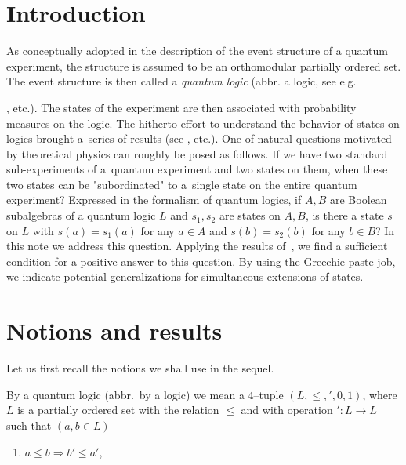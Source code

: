 \documentclass{article}
\begin{document}


\section{Introduction}

As conceptually adopted in the description of the event structure of a quantum experiment, the structure is assumed to be an orthomodular partially ordered set. The event structure is then called a \textit{quantum logic} (abbr. a logic, see e.g.~{\cite{GudderBook,PtakPulmannova, Svozil}, etc.).
The states of the experiment are then associated with probability measures on the logic. The hitherto effort to understand the behavior of states on logics brought a~series of results (see \cite{HornTarski, Kalmbach, Greechie, NavaraPtakRogalewicz, PtakExotic, Shultz}, etc.).
One of natural questions motivated by theoretical physics can roughly be posed as follows.
If we have two standard sub-experiments of a~quantum experiment and two states on them, when these two states can be "subordinated" to a~single state on the entire quantum experiment? Expressed in the formalism of quantum logics, if $A,B$ are Boolean subalgebras of a quantum logic $L$ and $s_1,s_2$ are states on $A,B$, is there a state $s$ on $L$ with $s(a)=s_1(a)$ for any $a\in A$ and $s(b)=s_2(b)$ for any $b\in B$?
In this note we address this question. Applying the results of~\cite{RaoRao}, we find a sufficient condition for a positive answer to this question. 
By using the Greechie paste job, we indicate potential generalizations for simultaneous extensions of states.


\section{Notions and results}

Let us first recall the notions we shall use in the sequel.

\begin{definition}
By a quantum logic (abbr.\ by a logic) we mean a $4$--tuple
$(L,\leq,{}',0,1)$, where $L$ is a partially ordered set with the relation
$\leq$ and with operation ${}' : L\to L$ such that $(a,b \in L)$

\begin{enumerate}
\item[(i)] $a\leq b \Rightarrow b'\leq a'$,


\end{enumerate}
\end{definition}}
\end{document}
